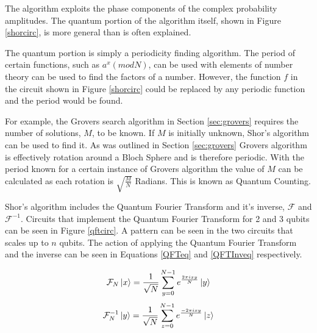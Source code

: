 The algorithm exploits the phase components of the complex probability amplitudes.
The quantum portion of the algorithm itself, shown in Figure \ref{shorcirc}, is more general than is often explained.

The quantum portion is simply a periodicity finding algorithm.
The period of certain functions, such as $a^x(mod N)$, can be used with elements of number theory can be used to find the factors of a number.
However, the function $f$ in the circuit shown in Figure \ref{shorcirc} could be replaced by any periodic function and the period would be found.

For example, the Grovers search algorithm in Section \ref{sec:grovers} requires the number of solutions, $M$, to be known.
If $M$ is initially unknown, Shor's algorithm can be used to find it.
As was outlined in Section \ref{sec:grovers} Grovers algorithm is effectively rotation around a Bloch Sphere and is therefore periodic.
With the period known for a certain instance of Grovers algorithm the value of $M$ can be calculated as each rotation is $\sqrt{\frac{M}{N}}$ Radians.
This is known as Quantum Counting\cite{Brassard:1998vj}.

Shor's algorithm includes the Quantum Fourier Transform and it's inverse, $\mathcal{F}$ and $\mathcal{F}^{-1}$.
Circuits that implement the Quantum Fourier Transform for 2 and 3 qubits can be seen in Figure \ref{qftcirc}.
A pattern can be seen in the two circuits that scales up to $n$ qubits.
The action of applying the Quantum Fourier Transform and the inverse can be seen in Equations \ref{QFTeq} and \ref{QFTInveq} respectively.

\begin{equation}
 \mathcal{F}_N\left\vert{x}\right\rangle=\frac{1}{\sqrt{N}}\sum_{y=0}^{N-1}e^{\frac{2\pi{i}xy}{N}}\left\vert{y}\right\rangle
\label{QFTeq}
\end{equation}
\begin{equation}
 \mathcal{F}^{-1}_N\left\vert{y}\right\rangle=\frac{1}{\sqrt{N}}\sum_{z=0}^{N-1}e^{\frac{-2\pi{i}xy}{N}}\left\vert{z}\right\rangle
\label{QFTInveq}
\end{equation}

